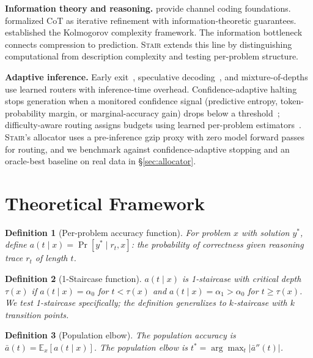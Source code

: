 \documentclass{article}
\newcommand{\method}{\textsc{Stair}}
\newcommand{\E}{\mathbb{E}}
\newtheorem{definition}{Definition}
\begin{document}
\textbf{Information theory and reasoning.}  \citet{polyanskiy2024it} provide channel coding foundations.  \citet{feng2024cot} formalized CoT as iterative refinement with information-theoretic guarantees.  \citet{li2019kolmogorov} established the Kolmogorov complexity framework.  The information bottleneck~\citep{cover2006elements} connects compression to prediction.  \method{} extends this line by distinguishing computational from description complexity and testing per-problem structure.

\textbf{Adaptive inference.}  Early exit~\citep{graves2016act,schuster2022calm}, speculative decoding~\citep{leviathan2023speculative}, and mixture-of-depths~\citep{raposo2024mixture} use learned routers with inference-time overhead.  Confidence-adaptive halting stops generation when a monitored confidence signal (predictive entropy, token-probability margin, or marginal-accuracy gain) drops below a threshold~\citep{schuster2022calm}; difficulty-aware routing assigns budgets using learned per-problem estimators~\citep{raposo2024mixture}.  \method{}'s allocator uses a pre-inference gzip proxy with zero model forward passes for routing, and we benchmark against confidence-adaptive stopping and an oracle-best baseline on real data in \S\ref{sec:allocator}.

\section{Theoretical Framework}
\label{sec:theory}

\begin{definition}[Per-problem accuracy function]
For problem $x$ with solution $y^*$, define $a(t \mid x) = \Pr[y^* \mid r_t, x]$: the probability of correctness given reasoning trace $r_t$ of length $t$.
\end{definition}

\begin{definition}[1-Staircase function]
\label{def:staircase}
$a(t \mid x)$ is \emph{1-staircase} with critical depth $\tau(x)$ if $a(t \mid x) = \alpha_0$ for $t < \tau(x)$ and $a(t \mid x) = \alpha_1 > \alpha_0$ for $t \geq \tau(x)$.  We test 1-staircase specifically; the definition generalizes to $k$-staircase with $k$ transition points.
\end{definition}

\begin{definition}[Population elbow]
The population accuracy is $\bar{a}(t) = \E_x[a(t \mid x)]$.  The population elbow is $t^* = \arg\max_t |\bar{a}''(t)|$.
\end{definition}
\end{document}
